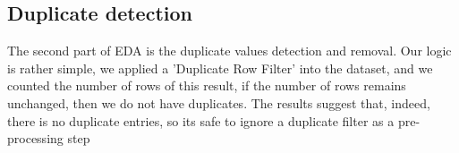 \documentclass[11pt]{article}
\begin{document}
		\subsection*{Duplicate detection}
			The second part of EDA is the duplicate values detection and removal. Our logic is rather simple, we applied a 'Duplicate Row Filter' into the dataset, and we counted the number of rows of this result, if the number of rows remains unchanged, then we do not have duplicates. The results suggest that, indeed, there is no duplicate entries, so its safe to ignore a duplicate filter as a pre-processing step

\end{document}
